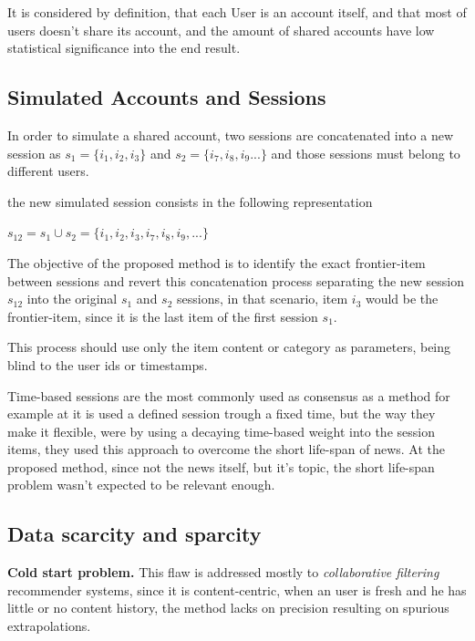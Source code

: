 \documentclass[ecp,tc,english]{iiufrgs}
\begin{document}
    It is considered by definition, that each User is an account itself, and that most of users doesn't share its account, and the amount of shared accounts have low  statistical significance into the end result.
    
        \subsection{Simulated Accounts and Sessions}
        In order to simulate a shared account, two sessions are concatenated into a new session as \(s_{1} = \{i_{1}, i_{2}, i_{3}\}\) and  \(s_{2} = \{i_{7}, i_{8}, i_{9} ...\}\) and those sessions must belong to different users.
    
        the new simulated session consists in the following representation
    
        \(s_{12} =  s_{1} \cup  s_{2} =  \{i_{1}, i_{2}, i_{3}, i_{7}, i_{8}, i_{9}, ...\}\)
    
        The objective of the proposed method is to identify the exact frontier-item between sessions and revert this concatenation process separating the new session  \(s_{12}\) into the original \(s_{1}\) and \(s_{2}\) sessions, in that scenario, item \(i_{3}\) would be the frontier-item, since it is the last item of the first session \(s_{1}\).
    
        This process should use only the item content or category as parameters, being blind to the user ids or timestamps.
        
        Time-based sessions are the most commonly used as consensus as a method for example at \cite{sottocornola2018} it is used a defined session trough a fixed time, but the way they make it flexible, were by using a decaying time-based weight into the session items, they used this approach to overcome the short life-span of news. At the proposed method, since not the news itself, but it's topic, the short life-span problem wasn't expected to be relevant enough.
    
        \subsection{Data scarcity and sparcity} \label{data_scarcity_and_sparcity}
        \textbf{Cold start problem.} This flaw is addressed mostly to \textit{collaborative filtering} recommender systems, since it is content-centric, when an user is fresh and he has little or no content history, the method lacks on precision resulting on spurious extrapolations.
    
\end{document}
